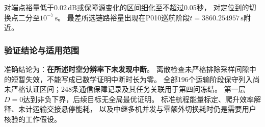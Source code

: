 对端点裕量低于$0.02\,\mathrm{dB}$或保障源变化的区间细化至不超过0.05秒，
对定位到的切换点二分至$10^{-7}\,\mathrm{s}$。
最差所选链路裕量出现在P010巡航阶段$t=3860.254957\,\mathrm{s}$附近。

\subsubsection{验证结论与适用范围}
准确结论为：\textbf{在所述时空分辨率下未发现中断}。
离散检查未严格排除采样间隙中的短暂失效，不能写成已数学证明中断时长为零。
全部196个运输阶段保守列入尚未严格认证区间；248条通信保障记录及其任务关联用于第四问冻结。
第一层$D=0$达到非负下界，后续目标无全局最优证明。
标准航程能量标定、爬升效率解释、未计运输交接悬停能耗，
以及中继多机并发与零额外切换耗时仍是需要用户核验的工作假设。
